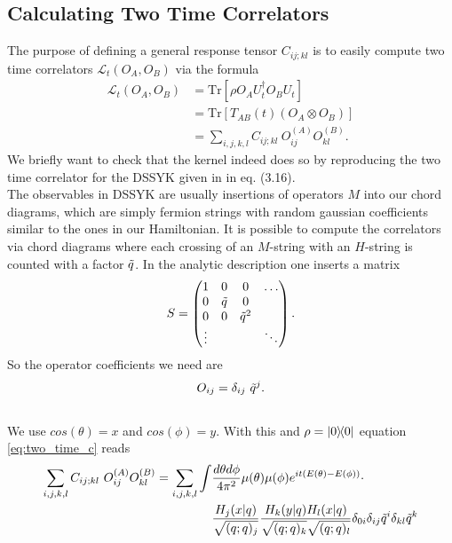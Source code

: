 \documentclass{scrarticle}
\begin{document}
\subsection{Calculating Two Time Correlators}
The purpose of defining a general response tensor $C_{ij;kl}$ is to easily compute two time correlators $\mathcal{L}_t(O_A, O_B)$ via the formula
\begin{align}
    \mathcal{L}_t(O_A, O_B) &= \text{Tr}\left[ \rho O_A U_t^\dagger O_B U_t \right] \nonumber \\
        &= \text{Tr}\left[T_{AB}(t) (O_A \otimes O_B) \right] \nonumber \\
        &= \sum_{i,j, k, l} C_{ij;kl} \ O_{ij}^{(A)} O_{kl}^{(B)}.
        \label{eq:two_time_c}
\end{align}
We briefly want to check that the kernel indeed does so by reproducing the two time correlator for the DSSYK given in \cite{berkooz_towards_2018} in eq. (3.16).\\
The observables in DSSYK are usually insertions of operators $M$ into our chord diagrams, which are simply fermion strings with random gaussian coefficients similar to the ones in our Hamiltonian. It is possible to compute the correlators via chord diagrams where each crossing of an $M$-string with an $H$-string is counted with a factor $\Tilde{q}$. In the analytic description one inserts a matrix 
\begin{align}
    S = \begin{pmatrix}
        1 & 0 & 0 & \ldots \\ 
        0 & \Tilde{q} & 0\\
        0 & 0&\Tilde{q}^2 \\
        \vdots & & & \ddots
    \end{pmatrix}.
\end{align}
So the operator coefficients we need are
\begin{align}
    O_{ij} = \delta_{ij} \ \Tilde{q}^j.
\end{align}
\\
We use $cos(\theta) = x$ and $cos(\phi) = y$. With this and $\rho = \ketbra{0}{0}$ equation \ref{eq:two_time_c} reads
\begin{align}
    \sum_{i,j, k, l} C_{ij;kl} \ O_{ij}^{(A)} O_{kl}^{(B)} = \sum_{i,j,k,l} \int &\frac{d\theta d\phi}{4 \pi^2} \mu(\theta) \mu(\phi) e^{i t(E(\theta) - E(\phi))} \cdot \nonumber
    \\ &\frac{H_j(x|q)}{\sqrt{(q;q)_j}} \frac{H_k(y|q) H_l(x|q)}{\sqrt{(q;q)_k}\sqrt{(q;q)_l}} \delta_{0i} \delta_{ij} \Tilde{q}^i \delta_{kl} \Tilde{q}^k
\end{align}
\end{document}
